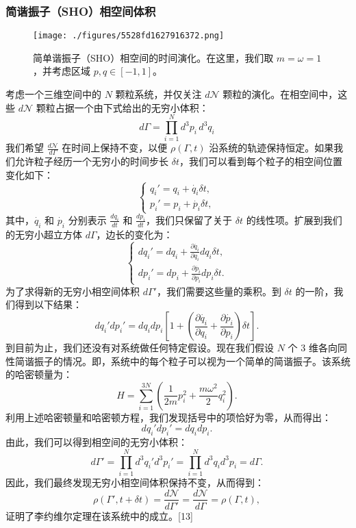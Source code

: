 \subsubsection{简谐振子（SHO）相空间体积}
\begin{figure}[ht]
\centering
\texttt{[image: ./figures/5528fd1627916372.png]}
\caption{简单谐振子（SHO）相空间的时间演化。在这里，我们取 \( m = \omega = 1 \)，并考虑区域 \( p, q \in [-1, 1] \)。} \label{fig_LWR_2}
\end{figure}
考虑一个三维空间中的 \(N\) 颗粒系统，并仅关注 \(d\mathcal{N}\) 颗粒的演化。在相空间中，这些 \(d\mathcal{N}\) 颗粒占据一个由下式给出的无穷小体积：
\[
d\Gamma = \prod_{i=1}^{N} d^3p_i \, d^3q_i~
\]
我们希望 \( \frac{d\mathcal{N}}{d\Gamma} \) 在时间上保持不变，以便 \( \rho(\Gamma, t) \) 沿系统的轨迹保持恒定。如果我们允许粒子经历一个无穷小的时间步长 \( \delta t \)，我们可以看到每个粒子的相空间位置变化如下：
\[
\begin{cases}
q_i' = q_i + \dot{q_i} \delta t, \\
p_i' = p_i + \dot{p_i} \delta t,
\end{cases}~
\]
其中，\( \dot{q_i} \) 和 \( \dot{p_i} \) 分别表示 \( \frac{dq_i}{dt} \) 和 \( \frac{dp_i}{dt} \)，我们只保留了关于 \( \delta t \) 的线性项。扩展到我们的无穷小超立方体 \( d\Gamma \)，边长的变化为：
\[
\begin{cases}
dq_i' = dq_i + \frac{\partial \dot{q_i}}{\partial q_i} dq_i \delta t, \\
dp_i' = dp_i + \frac{\partial \dot{p_i}}{\partial p_i} dp_i \delta t.
\end{cases}~
\]
为了求得新的无穷小相空间体积 \( d\Gamma' \)，我们需要这些量的乘积。到 \( \delta t \) 的一阶，我们得到以下结果：
\[
dq_i' dp_i' = dq_i dp_i \left[1 + \left( \frac{\partial \dot{q_i}}{\partial q_i} + \frac{\partial \dot{p_i}}{\partial p_i} \right) \delta t \right].~
\]
到目前为止，我们还没有对系统做任何特定假设。现在我们假设 \( N \) 个 3 维各向同性简谐振子的情况。即，系统中的每个粒子可以视为一个简单的简谐振子。该系统的哈密顿量为：
\[
H = \sum_{i=1}^{3N} \left( \frac{1}{2m} p_i^2 + \frac{m\omega^2}{2} q_i^2 \right).~
\]
利用上述哈密顿量和哈密顿方程，我们发现括号中的项恰好为零，从而得出：
\[
dq_i' dp_i' = dq_i dp_i.~
\]
由此，我们可以得到相空间的无穷小体积：
\[
d\Gamma' = \prod_{i=1}^{N} d^3q_i' d^3p_i' = \prod_{i=1}^{N} d^3q_i d^3p_i = d\Gamma.~
\]
因此，我们最终发现无穷小相空间体积保持不变，从而得到：
\[
\rho(\Gamma', t + \delta t) = \frac{d\mathcal{N}}{d\Gamma'} = \frac{d\mathcal{N}}{d\Gamma} = \rho(\Gamma, t),~
\]
证明了李约维尔定理在该系统中的成立。[13]

